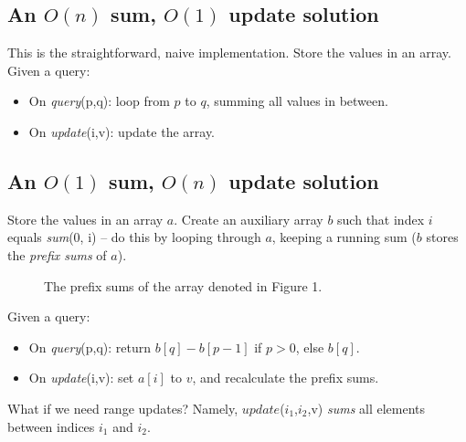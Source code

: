 \documentclass{article}
\begin{document}
\subsection{An $O(n)$ sum, $O(1)$ update solution}
This is the straightforward, naive implementation. Store the values in an array. Given a query:
\begin{itemize}
    \item On \textit{query}(p,q): loop from $p$ to $q$, summing all values in between.
    \item On \textit{update}(i,v): update the array.
\end{itemize}

\subsection{An $O(1)$ sum, $O(n)$ update solution}
Store the values in an array $a$. Create an auxiliary array $b$ such that index $i$ equals \textit{sum}(0, i) -- do this by looping through $a$, keeping a running sum ($b$ stores the \textit{prefix sums} of $a$).
\begin{figure}[h]
\centering
{
}
\caption{The prefix sums of the array denoted in Figure 1.}
\end{figure}
Given a query:
\begin{itemize}
    \item On \textit{query}(p,q): return $b[q] - b[p-1]$ if $p > 0$, else $b[q]$.
    \item On \textit{update}(i,v): set $a[i]$ to $v$, and recalculate the prefix sums.
\end{itemize}
What if we need range updates? Namely, $update$($i_1$,$i_2$,v) \textit{sums} all elements between indices $i_1$ and $i_2$. 
\end{document}
